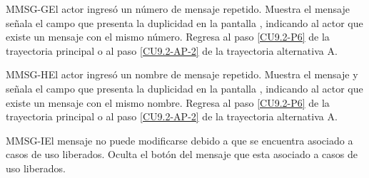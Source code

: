 	\begin{UCtrayectoriaA}{MMSG-G}{El actor ingresó un número de mensaje repetido.}
		\UCpaso[\UCsist] Muestra el mensaje  señala el campo que presenta la duplicidad en la pantalla , indicando al actor que existe un mensaje con el mismo número.
		\UCpaso Regresa al paso \ref{CU9.2-P6} de la trayectoria principal o al paso \ref{CU9.2-AP-2} de la trayectoria alternativa A.
	\end{UCtrayectoriaA}
	
	\begin{UCtrayectoriaA}{MMSG-H}{El actor ingresó un nombre de mensaje repetido.}
		\UCpaso[\UCsist] Muestra el mensaje  y señala el campo que presenta la duplicidad en la pantalla , indicando al actor que existe un mensaje con el mismo nombre.
		\UCpaso Regresa al paso \ref{CU9.2-P6} de la trayectoria principal o al paso \ref{CU9.2-AP-2} de la trayectoria alternativa A.
	\end{UCtrayectoriaA}

	\begin{UCtrayectoriaA}{MMSG-I}{El mensaje no puede modificarse debido a que se encuentra asociado a casos de uso liberados.}
		\UCpaso[\UCsist] Oculta el botón \editar del mensaje que esta asociado a casos de uso liberados.
	\end{UCtrayectoriaA}
